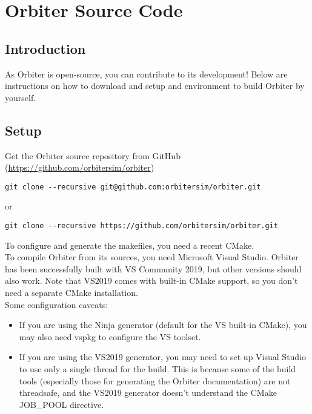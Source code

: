 \documentclass[Orbiter Developer Manual.tex]{subfiles}
\begin{document}
\section{Orbiter Source Code}

\subsection{Introduction}
As Orbiter is open-source, you can contribute to its development!
Below are instructions on how to download and setup and environment to build Orbiter by yourself.


\subsection{Setup}
Get the Orbiter source repository from GitHub (\url{https://github.com/orbitersim/orbiter})

\begin{lstlisting}
git clone --recursive git@github.com:orbitersim/orbiter.git
\end{lstlisting}

\noindent
or

\begin{lstlisting}
git clone --recursive https://github.com/orbitersim/orbiter.git
\end{lstlisting}

\noindent
To configure and generate the makefiles, you need a recent CMake.\\
To compile Orbiter from its sources, you need Microsoft Visual Studio. Orbiter has been successfully built with VS Community 2019, but other versions should also work. Note that VS2019 comes with built-in CMake support, so you don't need a separate CMake installation.\\
Some configuration caveats:

\begin{itemize}
\item If you are using the Ninja generator (default for the VS built-in CMake), you may also need vspkg to configure the VS toolset.
\item If you are using the VS2019 generator, you may need to set up Visual Studio to use only a single thread for the build. This is because some of the build tools (especially those for generating the Orbiter documentation) are not threadsafe, and the VS2019 generator doesn't understand the CMake JOB\_POOL directive.
\end{itemize}
\end{document}
